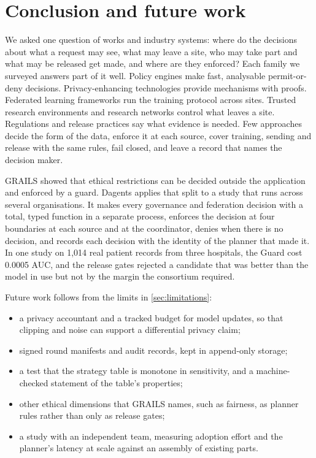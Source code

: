 \section{Conclusion and future work}
\label{sec:conclusion}

We asked one question of \SurveyWorks{} works and industry systems: where do
the decisions about what a request may see, what may leave a site, who may take
part and what may be released get made, and where are they enforced? Each
family we surveyed answers part of it well. Policy engines make fast,
analysable permit-or-deny decisions. Privacy-enhancing technologies provide
mechanisms with proofs. Federated learning frameworks run the training
protocol across sites. Trusted research environments and research networks
control what leaves a site. Regulations and release practices say what evidence
is needed. Few approaches decide the form of the data, enforce it at each
source, cover training, sending and release with the same rules, fail closed,
and leave a record that names the decision maker.

GRAILS showed that ethical restrictions can be decided outside the application
and enforced by a guard. Dagents applies that split to a study that runs across
several organisations. It makes every governance and federation decision with a
total, typed function in a separate process, enforces the decision at four
boundaries at each source and at the coordinator, denies when there is no
decision, and records each decision with the identity of the planner that made
it. In one study on 1,014 real patient records from three hospitals, the Guard
cost 0.0005 AUC, and the release gates rejected a candidate that was better
than the model in use but not by the margin the consortium required.

Future work follows from the limits in \cref{sec:limitations}:
\begin{itemize}
  \item a privacy accountant and a tracked budget for model updates, so that
        clipping and noise can support a differential privacy claim;
  \item signed round manifests and audit records, kept in append-only storage;
  \item a test that the strategy table is monotone in sensitivity, and a
        machine-checked statement of the table's properties;
  \item other ethical dimensions that GRAILS names, such as fairness, as
        planner rules rather than only as release gates;
  \item a study with an independent team, measuring adoption effort and the
        planner's latency at scale against an assembly of existing parts.
\end{itemize}
